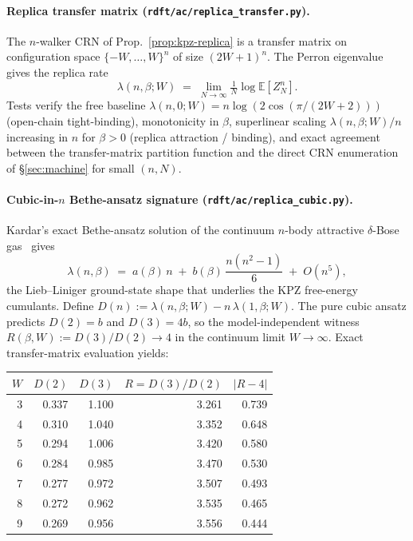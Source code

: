 \documentclass[10pt,a4paper,twocolumn]{article}
\theoremstyle{plain}
\theoremstyle{definition}
\newcommand{\Ex}{\mathbb{E}}
\begin{document}
\paragraph{Replica transfer matrix
(\texttt{rdft/ac/replica\_transfer.py}).}
The $n$-walker CRN of Prop.~\ref{prop:kpz-replica} is a transfer
matrix on configuration space $\{-W, \dots, W\}^n$ of size
$(2W+1)^n$.  The Perron eigenvalue gives the replica rate
\begin{equation}
  \lambda(n, \beta; W) \;=\;
   \lim_{N \to \infty} \tfrac{1}{N} \log \Ex[Z_N^n].
\end{equation}
Tests verify the free baseline $\lambda(n, 0; W) = n \log(2
\cos(\pi/(2W+2)))$ (open-chain tight-binding), monotonicity in
$\beta$, superlinear scaling $\lambda(n, \beta; W) / n$ increasing in
$n$ for $\beta > 0$ (replica attraction / binding), and exact
agreement between the transfer-matrix partition function and the
direct CRN enumeration of \S\ref{sec:machine} for small $(n, N)$.

\paragraph{Cubic-in-$n$ Bethe-ansatz signature
(\texttt{rdft/ac/replica\_cubic.py}).}
Kardar's exact Bethe-ansatz solution of the continuum
$n$-body attractive $\delta$-Bose gas~\citep{Kardar1987,
CalabreseLeDoussalRosso2010} gives
\begin{equation}
  \lambda(n, \beta) \;=\; a(\beta)\, n \;+\; b(\beta)\, \frac{n(n^2 - 1)}{6}
  \;+\; O(n^5),
\end{equation}
the Lieb--Liniger ground-state shape that underlies the KPZ
free-energy cumulants.  Define $D(n) := \lambda(n, \beta; W) - n\,
\lambda(1, \beta; W)$.  The pure cubic ansatz predicts
$D(2) = b$ and $D(3) = 4b$, so the model-independent witness
$R(\beta, W) := D(3) / D(2) \to 4$ in the continuum limit
$W \to \infty$.  Exact transfer-matrix evaluation yields:

\medskip
\noindent
\begin{tabular}{@{}rrrrr@{}}
\toprule
$W$ & $D(2)$ & $D(3)$ & $R = D(3)/D(2)$ & $|R - 4|$ \\
\midrule
3 & 0.337 & 1.100 & 3.261 & 0.739 \\
4 & 0.310 & 1.040 & 3.352 & 0.648 \\
5 & 0.294 & 1.006 & 3.420 & 0.580 \\
6 & 0.284 & 0.985 & 3.470 & 0.530 \\
7 & 0.277 & 0.972 & 3.507 & 0.493 \\
8 & 0.272 & 0.962 & 3.535 & 0.465 \\
9 & 0.269 & 0.956 & 3.556 & 0.444 \\
\bottomrule
\end{tabular}
\end{document}

